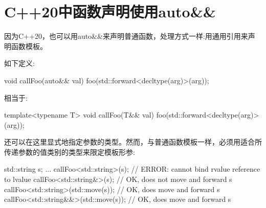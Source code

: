 \section{C++20中函数声明使用auto\&\&}
因为C++20，也可以用auto\&\&来声明普通函数，处理方式一样:用通用引用来声明函数模板。

如下定义:

\begin{cppcode}
void callFoo(auto&& val) {
	foo(std::forward<decltype(arg)>(arg));
}
\end{cppcode}

相当于:

\begin{cppcode}
template<typename T>
void callFoo(T&& val) {
	foo(std::forward<decltype(arg)>(arg));
}
\end{cppcode}

还可以在这里显式地指定参数的类型。然而，与普通函数模板一样，必须用适合所传递参数的值类别的类型来限定模板形参:

\begin{cppcode}
std::string s;
...
callFoo<std::string>(s); // ERROR: cannot bind rvalue reference to lvalue
callFoo<std::string&>(s); // OK, does not move and forward s
callFoo<std::string>(std::move(s)); // OK, does move and forward s
callFoo<std::string&&>(std::move(s)); // OK, does move and forward s
\end{cppcode}






































